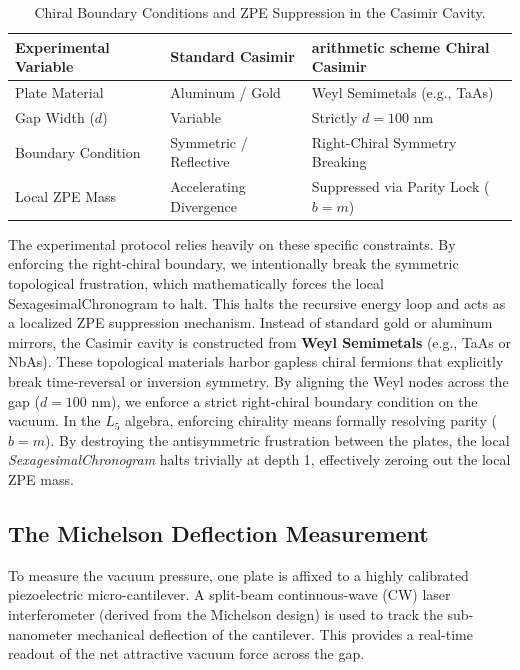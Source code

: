 \documentclass[12pt,oneside]{article}
\theoremstyle{principia}
\theoremstyle{definition}
\theoremstyle{remark}
\begin{document}
\begin{table}[ht]
\centering
\begin{tabular}{|l|l|l|}
\hline
\textbf{Experimental Variable} & \textbf{Standard Casimir} & \textbf{arithmetic scheme Chiral Casimir} \\
\hline
Plate Material & Aluminum / Gold & Weyl Semimetals (e.g., TaAs) \\
Gap Width ($d$) & Variable & Strictly $d = 100$ nm \\
Boundary Condition & Symmetric / Reflective & Right-Chiral Symmetry Breaking \\
Local ZPE Mass & Accelerating Divergence & Suppressed via Parity Lock ($b=m$) \\
\hline
\end{tabular}
\caption{Chiral Boundary Conditions and ZPE Suppression in the Casimir Cavity.}
\label{tab:chiral_casimir}
\end{table}

The experimental protocol relies heavily on these specific constraints. By enforcing the right-chiral boundary, we intentionally break the symmetric topological frustration, which mathematically forces the local SexagesimalChronogram to halt. This halts the recursive energy loop and acts as a localized ZPE suppression mechanism.
Instead of standard gold or aluminum mirrors, the Casimir cavity is constructed from \textbf{Weyl Semimetals} (e.g., TaAs or NbAs). These topological materials harbor gapless chiral fermions that explicitly break time-reversal or inversion symmetry. By aligning the Weyl nodes across the gap ($d = 100\text{ nm}$), we enforce a strict right-chiral boundary condition on the vacuum. In the $L_5$ algebra, enforcing chirality means formally resolving parity ($b = m$). By destroying the antisymmetric frustration between the plates, the local \emph{SexagesimalChronogram} halts trivially at depth 1, effectively zeroing out the local ZPE mass.

\subsection{The Michelson Deflection Measurement}\label{sec:michelson}
To measure the vacuum pressure, one plate is affixed to a highly calibrated piezoelectric micro-cantilever. A split-beam continuous-wave (CW) laser interferometer (derived from the Michelson design) is used to track the sub-nanometer mechanical deflection of the cantilever. This provides a real-time readout of the net attractive vacuum force across the gap.
\end{document}
